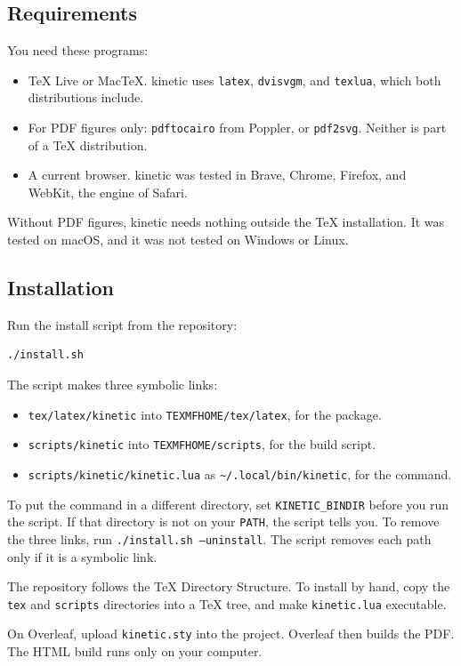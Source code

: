 \documentclass[11pt]{article}
\newcommand{\pkg}{\textsf{kinetic}}
\newcommand{\cmd}[1]{\texttt{#1}}
\begin{document}
\subsection{Requirements}

You need these programs:
\begin{itemize}
	\item TeX Live or MacTeX. \pkg{} uses \cmd{latex}, \cmd{dvisvgm}, and
	      \cmd{texlua}, which both distributions include.
	\item For PDF figures only: \cmd{pdftocairo} from Poppler, or \cmd{pdf2svg}.
	      Neither is part of a TeX distribution.
	\item A current browser. \pkg{} was tested in Brave, Chrome, Firefox, and
	      WebKit, the engine of Safari.
\end{itemize}

Without PDF figures, \pkg{} needs nothing outside the TeX installation. It was tested on macOS,
and it was not tested on Windows or Linux.

\subsection{Installation}

Run the install script from the repository:
\begin{lstlisting}
./install.sh
\end{lstlisting}
The script makes three symbolic links:
\begin{itemize}
	\item \cmd{tex/latex/kinetic} into \cmd{TEXMFHOME/tex/latex}, for the package.
	\item \cmd{scripts/kinetic} into \cmd{TEXMFHOME/scripts}, for the build script.
	\item \cmd{scripts/kinetic/kinetic.lua} as \cmd{\textasciitilde/.local/bin/kinetic},
	      for the command.
\end{itemize}
To put the command in a different directory, set \cmd{KINETIC\_BINDIR} before you
run the script. If that directory is not on your \cmd{PATH}, the script tells you.
To remove the three links, run \cmd{./install.sh --uninstall}. The script removes
each path only if it is a symbolic link.

The repository follows the TeX Directory Structure. To install by hand, copy the
\cmd{tex} and \cmd{scripts} directories into a TeX tree, and make
\cmd{kinetic.lua} executable.

On Overleaf, upload \cmd{kinetic.sty} into the project. Overleaf then builds the
PDF. The HTML build runs only on your computer.
\end{document}

